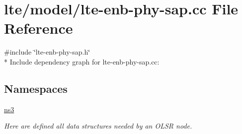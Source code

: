 \hypertarget{lte-enb-phy-sap_8cc}{}\section{lte/model/lte-\/enb-\/phy-\/sap.cc File Reference}
\label{lte-enb-phy-sap_8cc}
{\ttfamily \#include \char`\"{}lte-\/enb-\/phy-\/sap.\+h\char`\"{}}\\*
Include dependency graph for lte-\/enb-\/phy-\/sap.cc\+:
\subsection*{Namespaces}
\begin{DoxyCompactItemize}
\item 
 \hyperlink{namespacens3}{ns3}
\begin{DoxyCompactList}\small\item\em Here are defined all data structures needed by an O\+L\+SR node. \end{DoxyCompactList}\end{DoxyCompactItemize}
